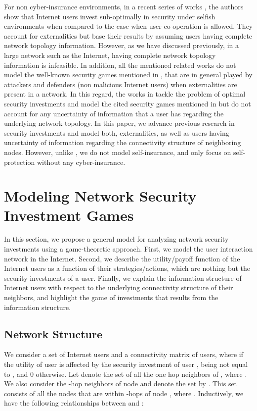 \documentclass[letterpaper,12pt,onecolumn, nodraft]{IEEEtran}
\begin{document}
For non cyber-insurance environments, in a recent series of works \cite{jaw}\cite{oom}, the authors show that Internet users invest sub-optimally in security under selfish environments when compared to the case when user co-operation is allowed. They account for externalities but base their results by assuming users having complete network topology information. However, as we have discussed previously, in a large network such as the Internet, having complete network topology information is infeasible. In addition, all the mentioned related works do not model the well-known security games mentioned in \cite{hvar}, that are in general played by attackers and defenders (non malicious Internet users) when externalities are present in a network. In this regard, the works in \cite{zg}\cite{gccr1}\cite{gccr}  tackle the problem of optimal security investments and model the cited security games mentioned in \cite{hvar} but do not account for any uncertainty of information that a user has regarding the underlying network topology. In this paper, we advance previous research in security investments and model both, externalities, as well as users having uncertainty of information regarding the connectivity structure of neighboring nodes. However, unlike \cite{gccr1}\cite{gccr}, we do not model self-insurance, and only focus on self-protection without any cyber-insurance. 

\section{Modeling Network Security Investment Games}  \label{sec-model}
In this section, we propose a general model for analyzing network security investments using a game-theoretic approach. First, we model the user interaction network in the Internet. Second, we describe the utility/payoff function of the Internet users as a function of their strategies/actions, which are nothing but the security investments of a user. Finally, we explain the information structure of Internet users with respect to the underlying connectivity structure of their neighbors, and highlight the game of investments that results from the information structure. 

\subsection{Network Structure} \label{sec-ns}
We consider a set  of  Internet users and a connectivity matrix  of users, where  if the utility of user  is affected by the security investment of user ,  being not equal to , and 0 otherwise. Let  denote the set of all the one hop neighbors of , where . We also consider the -hop neighbors of node  and denote the set by . This set consists of all the nodes that are within -hops of node , where . Inductively,  we have the following relationships between  and :
\end{document}
